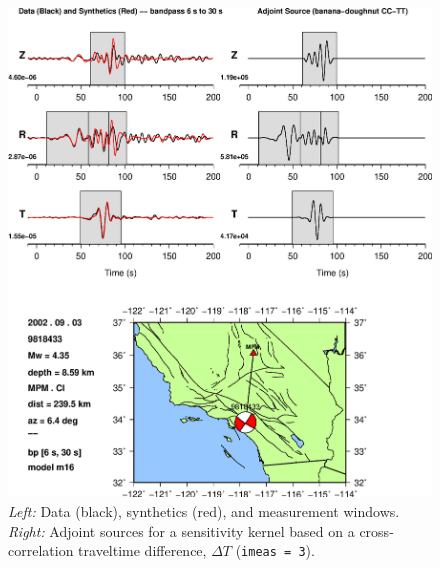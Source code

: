 \documentclass[11pt,titlepage,fleqn]{article}
\begin{document}
\begin{figure}
\includegraphics[width=17cm]{9818433_T006_T030_MPM_CI_m16_iker03_win_adj.eps}
\caption[]
{{
{\em Left:} Data (black), synthetics (red), and measurement windows.
{\em Right:} Adjoint sources for a sensitivity kernel based on a cross-correlation traveltime difference, $\Delta T$ ({\tt imeas = 3}).
\label{fig:iker03}
}}
\end{figure}
\end{document}
